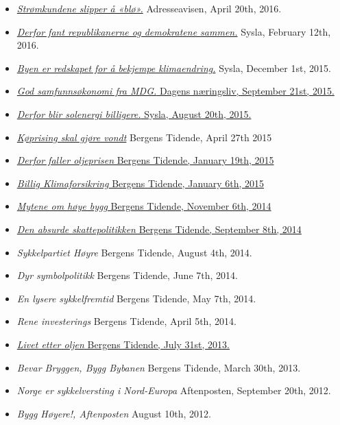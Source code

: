\documentclass[margin]{res}
\begin{document}
\begin{resume}
\begin{itemize}
\item[] \href{http://www.e-pages.dk/adresseavisen/5117/article/411985/41/6/render/?token=21b06b63e6a1cbd3e62966cf5706d3ab}{\emph{Str\o mkundene slipper \r{a} «bl\o».}} Adresseavisen, April 20th, 2016. 
\item[] \href{http://syslagronn.no/2016/02/12/syslagronn/derfor-fant-republikanerne-og-demokratene-sammen_76977/}{\emph{Derfor fant republikanerne og demokratene sammen.}} Sysla, February 12th, 2016.
\item[] \href{http://www.syslagronn.no/2015/12/01/syslagronn/byen-er-redskapet-for-a-bekjempe-klimaendringer_67934/}{\emph{Byen er redskapet for å bekjempe klimaendring.}} Sysla, December 1st, 2015.
\item[] \href{http://www.dn.no/meninger/2015/09/20/2043/Politikk/god-samfunnskonomi-fra-mdg}{\emph{God samfunnsøkonomi fra MDG.} Dagens n\ae ringsliv, September 21st, 2015.}
\item[] \href{http://www.syslagronn.no/2015/08/20/syslagronn/derfor-blir-solenergi-billigere_51484/}{\emph{Derfor blir solenergi billigere.} Sysla, August 20th, 2015.}
\item[] \href{http://www.e-pages.dk/bergenstidende/1809/article/264899/28/2/render/?token=02cd272aa0579373983f0bf8c4cee611}{ \emph{K\o prising skal gjøre vondt}} Bergens Tidende, April 27th 2015
\item[] \href{http://www.bt.no/meninger/debatt/Derfor-faller-oljeprisen-3282375.html}{ \emph {Derfor faller oljeprisen} Bergens Tidende, January 19th, 2015}
\item[] \href{http://www.e-pages.dk/bergenstidende/1700/article/227941/31/4/render/?token=5207fb9bf5f917b5276532ef05164266}{ \emph {Billig Klimaforsikring} Bergens Tidende, January 6th, 2015}
\item[] \href{http://www.bt.no/meninger/debatt/Mytene-om-hoye-bygg-3234980.html}{ \emph {Mytene om h\o ye bygg} Bergens Tidende, November 6th, 2014}
\item[] \href{http://www.bt.no/meninger/debatt/Den-absurde-skattepolitikken-3191273.html}{\emph{Den absurde skattepolitikken} Bergens Tidende, September 8th, 2014}
\item[] \emph {Sykkelpartiet H\o yre}  Bergens Tidende, August 4th, 2014.
\item[] \emph {Dyr symbolpolitikk}  Bergens Tidende, June 7th, 2014.
\item[] \emph {En lysere sykkelfremtid}  Bergens Tidende, May 7th, 2014.
\item[] \emph {Rene investerings}  Bergens Tidende, April 5th, 2014.
\item[] \href{http://www.nhh.no/Files/Filer/institutter/for/bedriftsøkonomisk_debatt/2013/mauritzen-livet_etter_oljen-bt-310713.pdf}{\emph {Livet etter oljen}  Bergens Tidende, July 31st, 2013.}
\item[] \emph {Bevar Bryggen, Bygg Bybanen}  Bergens Tidende, March 30th, 2013.
\item[] \emph {Norge er sykkelversting i Nord-Europa} Aftenposten, September 20th, 2012.
\item[] \emph {Bygg H\o yere!, Aftenposten} August 10th, 2012.
\end{itemize}


\end{resume}
\end{document}
